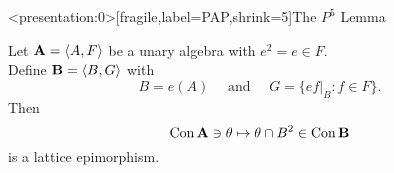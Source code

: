 \begin{frame}<presentation:0>[fragile,label=PAP,shrink=5]{The $P^5$ Lemma}
  \begin{lemma}[\PAP]
    Let $\mathbf{A} = \langle A, F\rangle$ be a unary algebra with 
    $e^2=e\in F$.\\[4pt]
    Define $\mathbf{B} = \langle B, G\rangle$ with
    \[B= e(A) \quad \text{ and } \quad G = \{ef\rvert_B : f\in F\}. \]
    Then 
    \[\mathrm{Con\,} \mathbf{A} \ni \theta \mapsto \theta \cap B^2 \in \mathrm{Con\,} \mathbf{B}\]
    is a lattice epimorphism.
  \end{lemma}
\end{frame}

